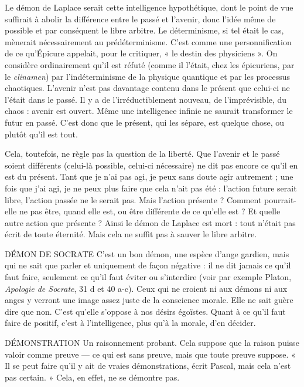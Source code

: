 Le démon de Laplace serait cette intelligence hypothétique, dont le point
de vue suffirait à abolir la différence entre le passé et l’avenir, donc l’idée même
de possible et par conséquent le libre arbitre. Le déterminisme, si tel était le cas,
mènerait nécessairement au prédéterminisme. C’est comme une personnification
de ce qu'Épicure appelait, pour le critiquer, « le destin des physiciens ».
On considère ordinairement qu’il est réfuté (comme il l'était, chez les épicuriens,
par le {\it clinamen}) par l’indéterminisme de la physique quantique et par les
processus chaotiques. L'avenir n’est pas davantage contenu dans le présent que
celui-ci ne l'était dans le passé. Il y a de l’irréductiblement nouveau, de l’imprévisible,
du chaos : avenir est ouvert. Même une intelligence infinie ne saurait
transformer le futur en passé. C’est donc que le présent, qui les sépare, est
quelque chose, ou plutôt qu’il est tout.

Cela, toutefois, ne règle pas la question de la liberté. Que l’avenir et le passé
soient différents (celui-là possible, celui-ci nécessaire) ne dit pas encore ce qu’il
en est du présent. Tant que je n’ai pas agi, je peux sans doute agir autrement ;
une fois que j'ai agi, je ne peux plus faire que cela n’ait pas été : l’action future
serait libre, l’action passée ne le serait pas. Mais l’action présente ? Comment
pourrait-elle ne pas être, quand elle est, ou être différente de ce qu’elle est ? Et
quelle autre action que présente ? Ainsi le démon de Laplace est mort : tout
n’était pas écrit de toute éternité. Mais cela ne suffit pas à sauver le libre arbitre.

DÉMON DE SOCRATE C’est un bon démon, une espèce d’ange gardien,
mais qui ne sait que parler et uniquement de
façon négative : il ne dit jamais ce qu’il faut faire, seulement ce qu’il faut éviter
ou s’interdire (voir par exemple Platon, {\it Apologie de Socrate}, 31 d et 40 a-c).
Ceux qui ne croient ni aux démons ni aux anges y verront une image assez juste
de la conscience morale. Elle ne sait guère dire que non. C’est qu’elle s’oppose
à nos désirs égoïstes. Quant à ce qu’il faut faire de positif, c’est à l’intelligence,
plus qu’à la morale, d’en décider.

DÉMONSTRATION Un raisonnement probant. Cela suppose que la raison
puisse valoir comme preuve — ce qui est sans preuve,
mais que toute preuve suppose. « Il se peut faire qu’il y ait de vraies démonstrations,
écrit Pascal, mais cela n’est pas certain. » Cela, en effet, ne se démontre
pas.

